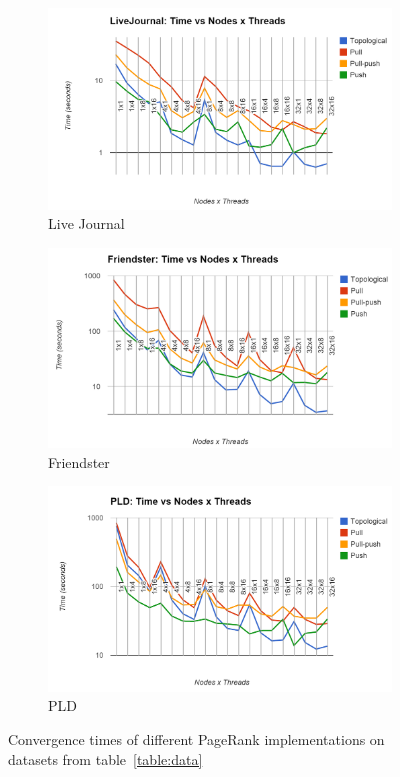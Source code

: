 \documentclass[letterpaper,11pt,onecolumn]{article}
\begin{document}
\begin{figure}
\begin{subfigure}{.33\textwidth}
  \centering
  \includegraphics[width=.99\linewidth]{LiveJournalTime}
  \caption{Live Journal}
  \label{fig:lgtime}
\end{subfigure}%
\begin{subfigure}{.33\textwidth}
  \centering
  \includegraphics[width=.99\linewidth]{FriendsterTime}
  \caption{Friendster}
  \label{fig:ftime}
\end{subfigure}
\begin{subfigure}{.33\textwidth}
  \centering
  \includegraphics[width=.99\linewidth]{PLDTime}
  \caption{PLD}
  \label{fig:ftime}
\end{subfigure}
\caption{Convergence times of different PageRank implementations on datasets from table~\ref{table:data}}
\label{fig:time}
\end{figure}
\end{document}
